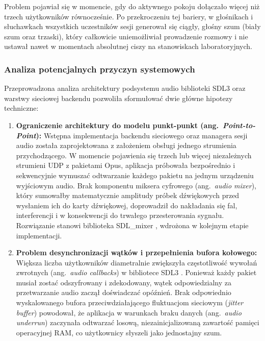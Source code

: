 Problem pojawiał się w momencie, gdy do aktywnego pokoju dołączało więcej niż
trzech użytkowników równocześnie. Po przekroczeniu tej bariery, w głośnikach
i słuchawkach wszystkich uczestników sesji generował się ciągły, głośny szum
(biały szum oraz trzaski), który całkowicie uniemożliwiał prowadzenie rozmowy
i nie ustawał nawet w momentach absolutnej ciszy na stanowiskach laboratoryjnych.

\subsubsection{Analiza potencjalnych przyczyn systemowych}
\label{subsubsec:db_przyczyny}

Przeprowadzona analiza architektury podsystemu audio biblioteki SDL3 \cite{SDL3}
oraz warstwy sieciowej backendu pozwoliła sformułować dwie główne hipotezy
techniczne:

\begin{enumerate}
	\item \textbf{Ograniczenie architektury do modelu punkt-punkt
		(ang.~\textit{Point-to-Point}):}
	Wstępna implementacja backendu sieciowego oraz managera sesji audio
	została zaprojektowana z założeniem obsługi jednego strumienia
	przychodzącego. W momencie pojawienia się trzech lub więcej niezależnych
	strumieni UDP z pakietami Opus, aplikacja próbowała bezpośrednio
	i sekwencyjnie wymuszać odtwarzanie każdego pakietu na jednym urządzeniu
	wyjściowym audio. Brak komponentu miksera cyfrowego
	(ang.~\textit{audio mixer}), który sumowałby matematycznie amplitudy
	próbek dźwiękowych przed wysłaniem ich do karty dźwiękowej, doprowadził
	do nakładania się fal, interferencji i w konsekwencji do trwałego
	przesterowania sygnału. Rozwiązanie stanowi biblioteka SDL\_mixer
	\cite{SDLMixer}, wdrożona w kolejnym etapie implementacji.
	
	\item \textbf{Problem desynchronizacji wątków i przepełnienia bufora kołowego:}
	Większa liczba użytkowników diametralnie zwiększyła częstotliwość
	wywołań zwrotnych (ang.~\textit{audio callbacks}) w bibliotece SDL3
	\cite{SDL3}. Ponieważ każdy pakiet musiał zostać odszyfrowany
	i zdekodowany, wątek odpowiedzialny za przetwarzanie audio zaczął
	doświadczać opóźnień. Brak odpowiednio wyskalowanego bufora
	przeciwdziałającego fluktuacjom sieciowym (\textit{jitter buffer})
	powodował, że aplikacja w warunkach braku danych
	(ang.~\textit{audio underrun}) zaczynała odtwarzać losową,
	niezainicjalizowaną zawartość pamięci operacyjnej RAM, co użytkownicy
	słyszeli jako jednostajny szum.
\end{enumerate}

